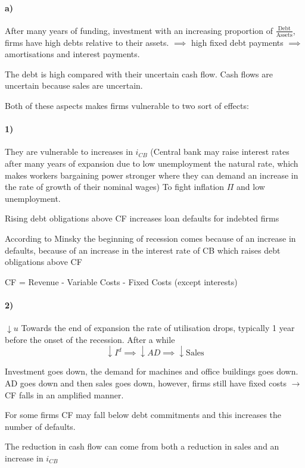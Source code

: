 \documentclass{report}
\begin{document}
\paragraph{a)} After many years of funding, investment with an increasing proportion of $\frac{\text{Debt}}{\text{Assets}}$, firms have high debts relative to their assets. $\implies$ high fixed debt payments $\implies$ amortisations and interest payments.

The debt is high compared with their uncertain cash flow. Cash flows are uncertain because sales are uncertain.

Both of these aspects makes firms vulnerable to two sort of effects:

\paragraph{1)} They are vulnerable to increases in $i_{CB}$ (Central bank may raise interest rates after many years of expansion due to low unemployment  the natural rate, which makes workers bargaining power stronger where they can demand an increase in the rate of growth of their nominal wages)
To fight inflation $\Pi$ and low unemployment.

Rising debt obligations above CF increases loan defaults for indebted firms

According to Minsky the beginning of recession comes because of an increase in defaults, because of an increase in the interest rate of CB which raises debt obligations above CF

CF = Revenue - Variable Costs - Fixed Costs (except interests)

\paragraph{2)} $\downarrow u$ Towards the end of expansion the rate of utilisation drops, typically 1 year before the onset of the recession. After a while $$\downarrow I^d \implies \downarrow AD \implies \downarrow \text{Sales}$$

Investment goes down, the demand for machines and office buildings goes down. AD goes down and then sales goes down, however, firms still have fixed costs $\rightarrow$ CF falls in an amplified manner.

For some firms CF may fall below debt commitments  and this increases the number of defaults. 

The reduction in cash flow can come from both a reduction in sales and an increase in $i_{CB}$
\end{document}
